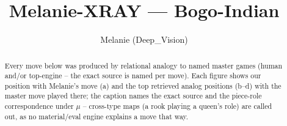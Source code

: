 \documentclass[11pt]{article}
\title{Melanie-XRAY — Bogo-Indian}
\author{Melanie (Deep\_Vision)}
\date{}
\begin{document}
\maketitle

\begin{abstract}Every move below was produced by relational analogy to named master games (human and/or top-engine -- the exact source is named per move). Each figure shows our position with Melanie's move (a) and the top retrieved analog positions (b--d) with the master move played there; the caption names the exact source and the piece-role correspondence under $\mu$ -- cross-type maps (a rook playing a queen's role) are called out, as no material/eval engine explains a move that way.\end{abstract}

\begin{figure}[p]\centering
\begin{subfigure}{0.46\textwidth}\centering
\resizebox{\linewidth}{!}{%
\newchessgame
\chessboard[
  setfen={r1b1k2r/ppppqppp/2n1pn2/8/2PP4/2B2NP1/PP2PP1P/R2QKB1R b KQkq - 0 7},
  showmover=false,
  pgfstyle=straightmove, color=movearrow, markmove={h7-h5}
]}
\caption{}
\end{subfigure}\hfill
\begin{subfigure}{0.46\textwidth}\centering
\resizebox{\linewidth}{!}{%
\newchessgame
\chessboard[
  setfen={r1bq1rk1/ppp2ppp/2nppn2/8/2PP4/P1B1PN2/1P3PPP/R2QKB1R b KQ - 0 8},
  showmover=false,
  pgfstyle=straightmove, color=movearrow, markmove={d8-e7}
]}
\caption{}
\end{subfigure}
\\[4pt]
\begin{subfigure}{0.46\textwidth}\centering
\resizebox{\linewidth}{!}{%
\newchessgame
\chessboard[
  setfen={r1bq1rk1/ppp2ppp/2nppn2/8/2PP4/P1B1PN2/1P3PPP/R2QKB1R b KQ - 0 8},
  showmover=false,
  pgfstyle=straightmove, color=movearrow, markmove={d8-e7}
]}
\caption{}
\end{subfigure}\hfill
\begin{subfigure}{0.46\textwidth}\centering
\resizebox{\linewidth}{!}{%
\newchessgame
\chessboard[
  setfen={r1bqkb1r/pp3ppp/2nppn2/2p5/4P3/2N2NP1/PPPP1PBP/R1BQK2R w KQkq - 4 6},
  showmover=false,
  pgfstyle=straightmove, color=movearrow, markmove={d2-d4}
]}
\caption{}
\end{subfigure}

\end{figure}
\end{document}
